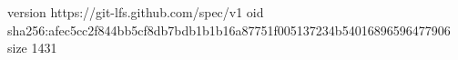version https://git-lfs.github.com/spec/v1
oid sha256:afec5cc2f844bb5cf8db7bdb1b1b16a87751f005137234b54016896596477906
size 1431
